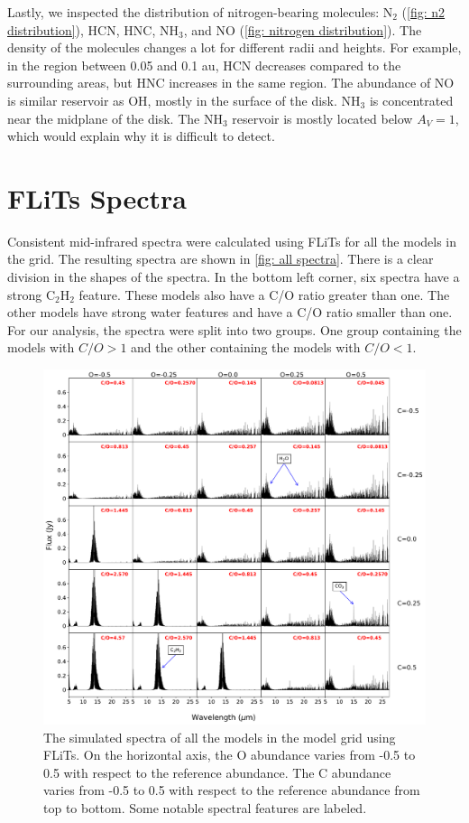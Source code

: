 \documentclass[oneside, single, authoryear, semicolon, 12pt]{lion-msc}
\newcommand{\4}{$_4$}
\newcommand{\3}{$_3$}
\newcommand{\2}{$_2$}
\begin{document}
Lastly, we inspected the distribution of nitrogen-bearing molecules: N\2 (\autoref{fig: n2 distribution}), HCN, HNC, NH\3, and NO (\autoref{fig: nitrogen distribution}). The density of the molecules changes a lot for different radii and heights. For example, in the region between 0.05 and 0.1 au, HCN decreases compared to the surrounding areas, but HNC increases in the same region. The abundance of NO is similar reservoir as OH, mostly in the surface of the disk. NH\3 is concentrated near the midplane of the disk. The NH\3 reservoir is mostly located below $A_V=1$, which would explain why it is difficult to detect.   
\newpage
\section{FLiTs Spectra}\label{sec: flits}
Consistent mid-infrared spectra were calculated using FLiTs for all the models in the grid. The resulting spectra are shown in \autoref{fig: all spectra}. There is a clear division in the shapes of the spectra. In the bottom left corner, six spectra have a strong C\2H\2 feature. These models also have a C/O ratio greater than one. The other models have strong water features and have a C/O ratio smaller than one. For our analysis, the spectra were split into two groups. One group containing the models with $C/O>1$ and the other containing the models with $C/O<1$.

\begin{figure}[H]
    \centering
    \includegraphics[width=.95\linewidth]{Figures/All_spectra.pdf}
    \caption{The simulated spectra of all the models in the model grid using FLiTs. On the horizontal axis, the O abundance varies from -0.5 to 0.5 with respect to the reference abundance. The C abundance varies from -0.5 to 0.5 with respect to the reference abundance from top to bottom. Some notable spectral features are labeled.}
    \label{fig: all spectra}
\end{figure}
\end{document}
